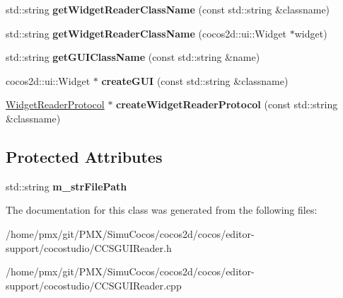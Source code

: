 \begin{DoxyCompactItemize}
\item 
\mbox{\label{classcocostudio_1_1WidgetPropertiesReader_a50f1c8dd76fb357af18e37482ee792f3}} 
std\+::string {\bfseries get\+Widget\+Reader\+Class\+Name} (const std\+::string \&classname)
\item 
\mbox{\label{classcocostudio_1_1WidgetPropertiesReader_a01e166acb32f94ea81628e9de1c57a23}} 
std\+::string {\bfseries get\+Widget\+Reader\+Class\+Name} (cocos2d\+::ui\+::\+Widget $\ast$widget)
\item 
\mbox{\label{classcocostudio_1_1WidgetPropertiesReader_ad6b6b1af7c7783970cdd25a7f49f9a54}} 
std\+::string {\bfseries get\+G\+U\+I\+Class\+Name} (const std\+::string \&name)
\item 
\mbox{\label{classcocostudio_1_1WidgetPropertiesReader_ad4d4c386ff9eff0275c4f5f95e59113f}} 
cocos2d\+::ui\+::\+Widget $\ast$ {\bfseries create\+G\+UI} (const std\+::string \&classname)
\item 
\mbox{\label{classcocostudio_1_1WidgetPropertiesReader_a6b5acea09985d9cedc4eca2d5c38d9e3}} 
\hyperlink{classcocostudio_1_1WidgetReaderProtocol}{Widget\+Reader\+Protocol} $\ast$ {\bfseries create\+Widget\+Reader\+Protocol} (const std\+::string \&classname)
\end{DoxyCompactItemize}
\subsection*{Protected Attributes}
\begin{DoxyCompactItemize}
\item 
\mbox{\label{classcocostudio_1_1WidgetPropertiesReader_a0f57215e727df78233b328e6f8f8d0f7}} 
std\+::string {\bfseries m\+\_\+str\+File\+Path}
\end{DoxyCompactItemize}


The documentation for this class was generated from the following files\+:\begin{DoxyCompactItemize}
\item 
/home/pmx/git/\+P\+M\+X/\+Simu\+Cocos/cocos2d/cocos/editor-\/support/cocostudio/C\+C\+S\+G\+U\+I\+Reader.\+h\item 
/home/pmx/git/\+P\+M\+X/\+Simu\+Cocos/cocos2d/cocos/editor-\/support/cocostudio/C\+C\+S\+G\+U\+I\+Reader.\+cpp\end{DoxyCompactItemize}
